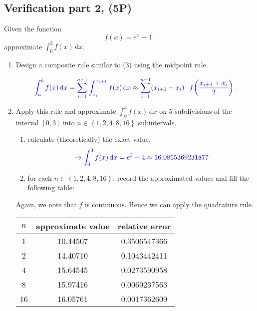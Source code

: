 \documentclass[11pt,oneside,reqno]{amsart}
\newcommand{\set}[1]{\ensuremath{\left\{{#1}\right\}}}
\begin{document}
\subsection{Verification part 2, (5P)}
Given the function 
\[ f(x) = e^x - 1\,. \]
approximate $\int_{0}^3 f(x) \,\mathrm{d}x$.
\begin{enumerate}
\setlength{\labelsep}{1em}\setlength\itemsep{0.75em}%
\item 
Design a  composite rule similar to (3) using the midpoint rule.

\[
\color{blue}
 \int _{a}^{b}f(x)\,\mathrm{d}x  
 =\sum_{i=1}^{n-1} \int _{x_i}^{x_{i+1}}f(x)\,\mathrm{d}x  
 \approx\sum_{i=1}^{n-1} (x_{i+1}-x_i)\cdot f\bigg(\frac{x_{i+1}+x_i}{2}\bigg) \,.
\]

\item Apply this rule and approximate $\int_{0}^3 f(x) \,\mathrm{d}x$ on 
5 subdivisions of the interval $[0,3]$ into $n \in\set{1,2,4,8,16}$ subintervals.
\begin{enumerate}
\setlength{\labelsep}{0.5em}\setlength\itemsep{0.5em}%
\item calculate (theoretically) the exact value. \\
\[\color{blue}
 \to \int_{0}^3 f(x) \,\mathrm{d}x = e^3-4 \approx 16.0855369231877
\]
\item for each $n\in\set{1,2,4,8,16}$, record the approximated values and fill the following table:
\end{enumerate}
{\small\color{blue}%
Again, we note that $f$ is continuous. Hence we can apply the quadrature rule.
\begin{center}
\smallskip
	\begin{tabular}{ccc}
	  \toprule
	  $n$  & approximate value & relative error\\
\midrule[0.1pt]
  1 &    10.44507 &   0.3506547366 \\
  2 &    14.40710 &   0.1043442411 \\
  4 &    15.64545 &   0.0273590958 \\
  8 &    15.97416 &   0.0069237563 \\
 16 &    16.05761 &   0.0017362609 \\
	  \bottomrule
	\end{tabular}
\smallskip
\end{center}}
\end{enumerate}
\end{document}
